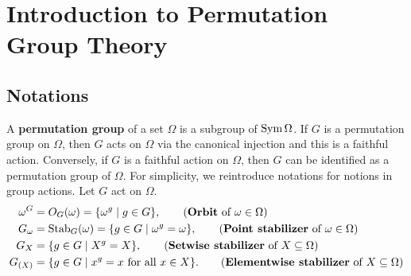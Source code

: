 \section{Introduction to Permutation Group Theory}
\subsection{Notations}
A \textbf{permutation group} of a set $\Omega$ is a subgroup of $\operatorname{Sym}\Omega$. If $G$ is a permutation group on $\Omega$, then $G$ acts on $\Omega$ via the canonical injection and this is a faithful action.  Conversely, if $G$ is a faithful action on $\Omega$, then $G$ can be identified as a permutation group of $\Omega$. For simplicity, we reintroduce notations for notions in group actions. Let $G$ act on $\Omega$.  
\begin{align*}
	\omega^G &= O_G(\omega) =\{\omega^g\mid g\in G\}, \tag{\textbf{Orbit} of $\omega \in \Omega$}
	\\
	G_{\omega} &= \operatorname{Stab}_G(\omega) = \{g\in G\mid \omega^g = \omega\}, \tag{\textbf{Point stabilizer} of $\omega\in \Omega$}
	\\
	G_{X} &=  \{g\in G\mid X^g = X\}, \tag{\textbf{Setwise stabilizer} of $X\subseteq \Omega$}
	\\
	G_{(X)} &=  \{g\in G\mid x^g = x\text{ for all }x\in X\}. \tag{\textbf{Elementwise stabilizer} of $X\subseteq \Omega$}
\end{align*}
